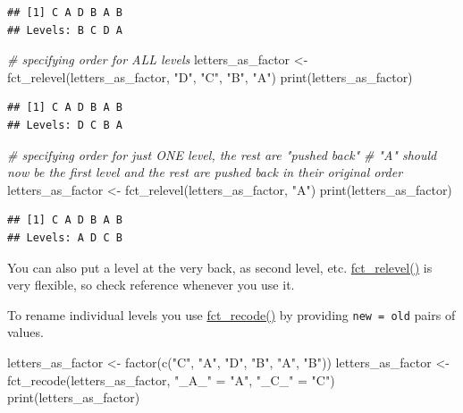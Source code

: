 \documentclass[
]{book}
\newenvironment{Shaded}{\begin{snugshade}}{\end{snugshade}}
\newcommand{\CommentTok}[1]{\textcolor[rgb]{0.56,0.35,0.01}{\textit{#1}}}
\newcommand{\FunctionTok}[1]{\textcolor[rgb]{0.00,0.00,0.00}{#1}}
\newcommand{\NormalTok}[1]{#1}
\newcommand{\OtherTok}[1]{\textcolor[rgb]{0.56,0.35,0.01}{#1}}
\newcommand{\StringTok}[1]{\textcolor[rgb]{0.31,0.60,0.02}{#1}}
\begin{document}
\begin{verbatim}
## [1] C A D B A B
## Levels: B C D A
\end{verbatim}

\begin{Shaded}
\begin{Highlighting}[]
\CommentTok{\# specifying order for ALL levels}
\NormalTok{letters\_as\_factor }\OtherTok{\textless{}{-}} \FunctionTok{fct\_relevel}\NormalTok{(letters\_as\_factor, }\StringTok{"D"}\NormalTok{, }\StringTok{"C"}\NormalTok{, }\StringTok{"B"}\NormalTok{, }\StringTok{"A"}\NormalTok{)}
\FunctionTok{print}\NormalTok{(letters\_as\_factor)}
\end{Highlighting}
\end{Shaded}

\begin{verbatim}
## [1] C A D B A B
## Levels: D C B A
\end{verbatim}

\begin{Shaded}
\begin{Highlighting}[]
\CommentTok{\# specifying order for just ONE level, the rest are "pushed back"}
\CommentTok{\# "A" should now be the first level and the rest are pushed back in their original order}
\NormalTok{letters\_as\_factor }\OtherTok{\textless{}{-}} \FunctionTok{fct\_relevel}\NormalTok{(letters\_as\_factor, }\StringTok{"A"}\NormalTok{)}
\FunctionTok{print}\NormalTok{(letters\_as\_factor)}
\end{Highlighting}
\end{Shaded}

\begin{verbatim}
## [1] C A D B A B
## Levels: A D C B
\end{verbatim}

You can also put a level at the very back, as second level, etc. \href{https://forcats.tidyverse.org/reference/fct_relevel.html}{fct\_relevel()} is very flexible, so check reference whenever you use it.

To rename individual levels you use \href{https://forcats.tidyverse.org/reference/fct_recode.html}{fct\_recode()} by providing \texttt{new\ =\ old} pairs of values.

\begin{Shaded}
\begin{Highlighting}[]
\NormalTok{letters\_as\_factor }\OtherTok{\textless{}{-}} \FunctionTok{factor}\NormalTok{(}\FunctionTok{c}\NormalTok{(}\StringTok{"C"}\NormalTok{, }\StringTok{"A"}\NormalTok{, }\StringTok{"D"}\NormalTok{, }\StringTok{"B"}\NormalTok{, }\StringTok{"A"}\NormalTok{, }\StringTok{"B"}\NormalTok{))}
\NormalTok{letters\_as\_factor }\OtherTok{\textless{}{-}} \FunctionTok{fct\_recode}\NormalTok{(letters\_as\_factor, }\StringTok{"\_A\_"} \OtherTok{=} \StringTok{"A"}\NormalTok{, }\StringTok{"\_C\_"} \OtherTok{=} \StringTok{"C"}\NormalTok{)}
\FunctionTok{print}\NormalTok{(letters\_as\_factor)}
\end{Highlighting}
\end{Shaded}
\end{document}
